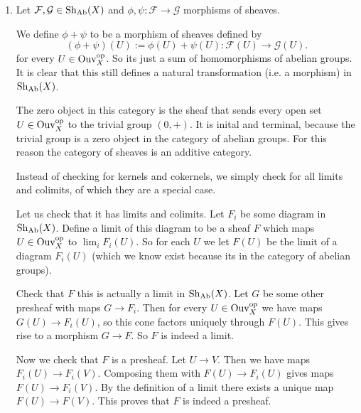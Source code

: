 \begin{exercise}{3}
    \begin{enumerate}
        \item{Let $\mathcal{F}, \mathcal{G} \in \operatorname{Sh}_{\text{Ab}}(X)$ and $\phi,
            \psi \colon \mathcal{F} \rightarrow \mathcal{G}$ morphisms of
            sheaves.

            We define $\phi + \psi$ to be a morphism of sheaves defined by
            \begin{equation*}
                (\phi+\psi)(U):=\phi(U) + \psi(U) \colon \mathcal{F}(U)
                \rightarrow \mathcal{G}(U).
            \end{equation*}
            for every $U \in \operatorname{Ouv}^{\text{op}}_X$. So its just a sum of
            homomorphisms of abelian groups. It is clear that this still defines
            a natural transformation (i.e. a morphism) in $\operatorname{Sh}_{\text{Ab}}(X)$.

            The zero object in this category is the sheaf that sends every open
            set $U \in \operatorname{Ouv}^{\text{op}}_X$ to the trivial group $(0,+)$. It is
            inital and terminal, because the trivial group is a zero object in
            the category of abelian groups. For this reason the category of
            sheaves is an additive category.

            Instead of checking for kernels and cokernels, we simply check for
            all limits and colimits, of which they are a special case.

            Let us check that it has limits and colimits. Let $F_i$ be some
            diagram in $\operatorname{Sh}_{\text{Ab}}(X)$. Define a limit of this diagram to
            be a sheaf $F$ which maps $U \in \operatorname{Ouv}^{\text{op}}_X$ to $\lim_i
            F_i(U)$. So for each $U$ we let $F(U)$ be the limit of a diagram
            $F_i(U)$ (which we know exist because its in the category of abelian
            groups).

            Check that $F$ this is actually a limit in $\operatorname{Sh}_{\text{Ab}}(X)$. Let
            $G$ be some other presheaf with maps $G \rightarrow F_i$. Then for
            every $U \in \operatorname{Ouv}^{\text{op}}_X$ we have maps $G(U) \rightarrow
            F_i(U)$, so this cone factors uniquely through $F(U)$. This gives
            rise to a morphism $G \rightarrow F$. So $F$ is indeed a limit.

            Now we check that $F$ is a presheaf. Let $U \rightarrow V$. Then we
            have maps $F_i(U) \rightarrow F_i(V)$. Composing them with $F(U)
            \rightarrow F_i(U)$ gives maps $F(U) \rightarrow F_i(V)$. By the
            definition of a limit there exists a unique map $F(U) \rightarrow
            F(V)$. This proves that $F$ is indeed a presheaf.

}
\end{enumerate}
\end{exercise}
